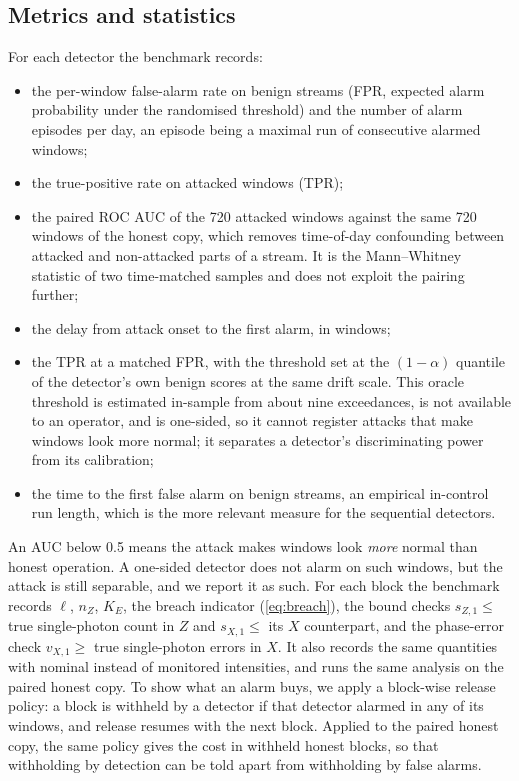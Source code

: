 \subsection{Metrics and statistics}
For each detector the benchmark records:
\begin{itemize}
\item the per-window false-alarm rate on benign streams (FPR, expected alarm probability under the randomised threshold) and the number of alarm episodes per day, an episode being a maximal run of consecutive alarmed windows;
\item the true-positive rate on attacked windows (TPR);
\item the paired ROC AUC of the 720 attacked windows against the same 720 windows of the honest copy, which removes time-of-day confounding between attacked and non-attacked parts of a stream. It is the Mann--Whitney statistic of two time-matched samples and does not exploit the pairing further;
\item the delay from attack onset to the first alarm, in windows;
\item the TPR at a matched FPR, with the threshold set at the $(1-\alpha)$ quantile of the detector's own benign scores at the same drift scale. This oracle threshold is estimated in-sample from about nine exceedances, is not available to an operator, and is one-sided, so it cannot register attacks that make windows look more normal; it separates a detector's discriminating power from its calibration;
\item the time to the first false alarm on benign streams, an empirical in-control run length, which is the more relevant measure for the sequential detectors.
\end{itemize}
An AUC below 0.5 means the attack makes windows look \emph{more} normal than honest operation. A one-sided detector does not alarm on such windows, but the attack is still separable, and we report it as such. For each block the benchmark records $\ell$, $n_Z$, $K_E$, the breach indicator (\ref{eq:breach}), the bound checks $s_{Z,1}\leq$ true single-photon count in $Z$ and $s_{X,1}\leq$ its $X$ counterpart, and the phase-error check $v_{X,1}\geq$ true single-photon errors in $X$. It also records the same quantities with nominal instead of monitored intensities, and runs the same analysis on the paired honest copy. To show what an alarm buys, we apply a block-wise release policy: a block is withheld by a detector if that detector alarmed in any of its windows, and release resumes with the next block. Applied to the paired honest copy, the same policy gives the cost in withheld honest blocks, so that withholding by detection can be told apart from withholding by false alarms.

